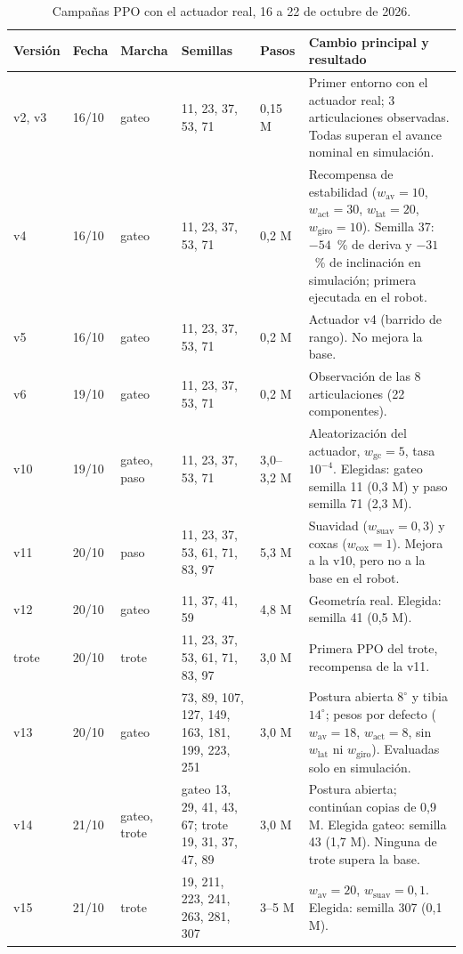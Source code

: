 \begin{table}[H]
\centering
\caption{Campañas PPO con el actuador real, 16 a 22 de octubre de 2026.}
\label{tab:campanas-ppo}
\scriptsize
\setlength{\tabcolsep}{3pt}
\begin{tabular}{p{}p{}p{}p{}p{}p{}}
\toprule
Versión & Fecha & Marcha & Semillas & Pasos & Cambio principal y resultado \\
\midrule
v2, v3 & 16/10 & gateo & 11, 23, 37, 53, 71 & 0,15 M & Primer entorno con el actuador real; 3 articulaciones observadas. Todas superan el avance nominal en simulación. \\
v4 & 16/10 & gateo & 11, 23, 37, 53, 71 & 0,2 M & Recompensa de estabilidad ($w_{\text{av}}=10$, $w_{\text{act}}=30$, $w_{\text{lat}}=20$, $w_{\text{giro}}=10$). Semilla 37: $-54$~\% de deriva y $-31$~\% de inclinación en simulación; primera ejecutada en el robot. \\
v5 & 16/10 & gateo & 11, 23, 37, 53, 71 & 0,2 M & Actuador v4 (barrido de rango). No mejora la base. \\
v6 & 19/10 & gateo & 11, 23, 37, 53, 71 & 0,2 M & Observación de las 8 articulaciones (22 componentes). \\
v10 & 19/10 & gateo, paso & 11, 23, 37, 53, 71 & 3,0--3,2 M & Aleatorización del actuador, $w_{\text{gc}}=5$, tasa $10^{-4}$. Elegidas: gateo semilla 11 (0,3 M) y paso semilla 71 (2,3 M). \\
v11 & 20/10 & paso & 11, 23, 37, 53, 61, 71, 83, 97 & 5,3 M & Suavidad ($w_{\text{suav}}=0{,}3$) y coxas ($w_{\text{cox}}=1$). Mejora a la v10, pero no a la base en el robot. \\
v12 & 20/10 & gateo & 11, 37, 41, 59 & 4,8 M & Geometría real. Elegida: semilla 41 (0,5 M). \\
trote & 20/10 & trote & 11, 23, 37, 53, 61, 71, 83, 97 & 3,0 M & Primera PPO del trote, recompensa de la v11. \\
v13 & 20/10 & gateo & 73, 89, 107, 127, 149, 163, 181, 199, 223, 251 & 3,0 M & Postura abierta $8^\circ$ y tibia $14^\circ$; pesos por defecto ($w_{\text{av}}=18$, $w_{\text{act}}=8$, sin $w_{\text{lat}}$ ni $w_{\text{giro}}$). Evaluadas solo en simulación. \\
v14 & 21/10 & gateo, trote & gateo 13, 29, 41, 43, 67; trote 19, 31, 37, 47, 89 & 3,0 M & Postura abierta; continúan copias de 0,9 M. Elegida gateo: semilla 43 (1,7 M). Ninguna de trote supera la base. \\
v15 & 21/10 & trote & 19, 211, 223, 241, 263, 281, 307 & 3--5 M & $w_{\text{av}}=20$, $w_{\text{suav}}=0{,}1$. Elegida: semilla 307 (0,1 M). \\

\end{tabular}
\end{table}
